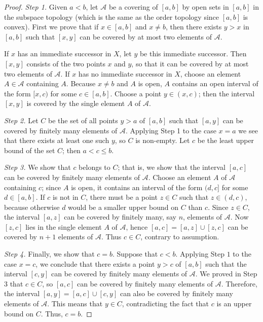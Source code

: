 \documentclass[12pt, a4paper, oneside, openright, titlepage]{book}
\begin{document}
\begin{proof}
    \emph{Step 1.} Given $a < b$, let $\mathcal{A}$ be a covering of $[a,b]$ by open sets in $[a,b]$ in the subspace topology (which is the same as the order topology since $[a,b]$ is convex). First we prove that if $x \in [a,b]$ and $x \neq b$, then there exists $y > x$ in $[a,b]$ such that $[x,y]$ can be covered by at most two elements of $\mathcal{A}$.

    If $x$ has an immediate successor in $X$, let $y$ be this immediate successor. Then $[x,y]$ consists of the two points $x$ and $y$, so that it can be covered by at most two elements of $\mathcal{A}$. If $x$ has no immediate successor in $X$, choose an element $A \in \mathcal{A}$ containing $A$. Because $x \neq b$ and $A$ is open, $A$ contains an open interval of the form $[x,c)$ for some $c \in [a,b]$. Choose a point $y \in (x,c)$; then the interval $[x,y]$ is covered by the single element $A$ of $\mathcal{A}$.

    \emph{Step 2.} Let $C$ be the set of all points $y > a$ of $[a,b]$ such that $[a,y]$ can be covered by finitely many elements of $\mathcal{A}$. Applying Step 1 to the case $x = a$ we see that there exists at least one such $y$, so $C$ is non-empty. Let $c$ be the least upper bound of the set $C$; then $a < c \leq b$.

    \emph{Step 3.} We show that $c$ belongs to $C$; that is, we show that the interval $[a,c]$ can be covered by finitely many elements of $\mathcal{A}$. Choose an element $A$ of $\mathcal{A}$ containing $c$; since $A$ is open, it contains an interval of the form $(d,c]$ for some $d \in [a,b]$. If $c$ is not in $C$, there must be a point $z \in C$ such that $z \in (d,c)$, because otherwise $d$ would be a smaller upper bound on $C$ than $c$. Since $z \in C$, the interval $[a,z]$ can be covered by finitely many, say $n$, elements of $\mathcal{A}$. Now $[z,c]$ lies in the single element $A$ of $\mathcal{A}$, hence $[a,c] = [a,z]\cup[z,c]$ can be covered by $n+1$ elements of $\mathcal{A}$. Thus $c \in C$, contrary to assumption.

    \emph{Step 4.} Finally, we show that $c = b$. Suppose that $c < b$. Applying Step $1$ to the case $x = c$, we conclude that there exists a point $y > c$ of $[a,b]$ such that the interval $[c,y]$ can be covered by finitely many elements of $\mathcal{A}$. We proved in Step 3 that $c \in C$, so $[a,c]$ can be covered by finitely many elements of $\mathcal{A}$. Therefore, the interval $[a,y] = [a,c] \cup [c,y]$ can also be covered by finitely many elements of $\mathcal{A}$. This means that $y \in C$, contradicting the fact that $c$ is an upper bound on $C$. Thus, $c = b$.
\end{proof}
\end{document}
